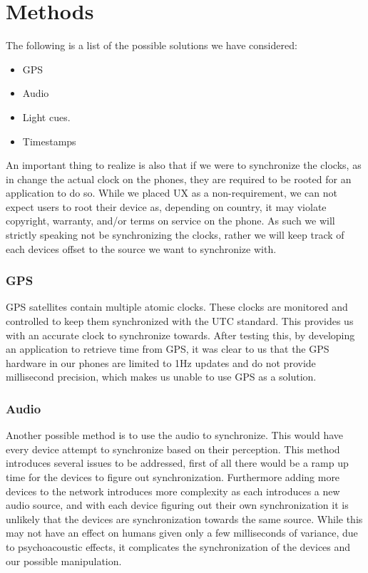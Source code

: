 \section{Methods}
The following is a list of the possible solutions we have considered:
\begin{itemize}
    \item GPS
    \item Audio
    \item Light cues.
    \item Timestamps
\end{itemize}
An important thing to realize is also that if we were to synchronize the clocks, as in change the actual clock on the phones, they are required to be rooted for an application to do so.
While we placed \ac{UX} as a non-requirement, we can not expect users to root their device as, depending on country, it may violate copyright, warranty, and/or terms on service on the phone.
As such we will strictly speaking not be synchronizing the clocks, rather we will keep track of each devices offset to the source we want to synchronize with.

\subsubsection{GPS}
GPS satellites contain multiple atomic clocks.
These clocks are monitored and controlled to keep them synchronized with the UTC standard.
This provides us with an accurate clock to synchronize towards.\citep{gpsclock}
After testing this, by developing an application to retrieve time from GPS, it was clear to us that the GPS hardware in our phones are limited to 1Hz updates and do not provide millisecond precision, which makes us unable to use GPS as a solution.

\subsubsection{Audio}
Another possible method is to use the audio to synchronize.
This would have every device attempt to synchronize based on their perception.
This method introduces several issues to be addressed, first of all there would be a ramp up time for the devices to figure out synchronization.
Furthermore adding more devices to the network introduces more complexity as each introduces a new audio source, and with each device figuring out their own synchronization it is unlikely that the devices are synchronization towards the same source.
While this may not have an effect on humans given only a few milliseconds of variance, due to psychoacoustic effects, it complicates the synchronization of the devices and our possible manipulation.

